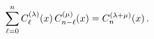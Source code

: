 \[\sum_{\ell=0}^{n}\mathop{C^{(\lambda)}_{\ell}\/}\nolimits\!\left(x\right)%
\mathop{C^{(\mu)}_{n-\ell}\/}\nolimits\!\left(x\right)=\mathop{C^{(\lambda+\mu%
)}_{n}\/}\nolimits\!\left(x\right).\]